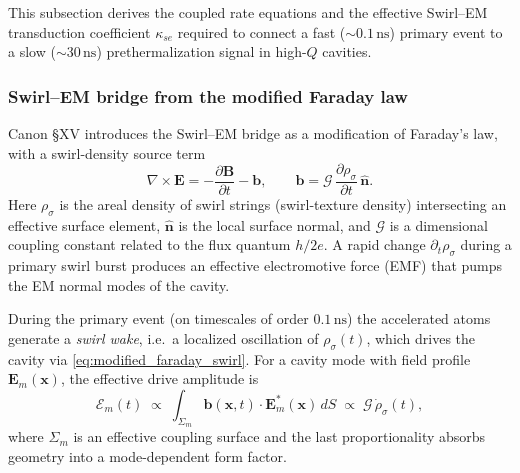 \documentclass[10pt,reprint,aps,onecolumn,nofootinbib]{revtex4-2}
\begin{document}
This subsection derives the coupled rate equations and the effective
Swirl–EM transduction coefficient \(\kappa_{se}\) required to connect a fast
(\(\sim 0.1\,\mathrm{ns}\)) primary event to a slow (\(\sim 30\,\mathrm{ns}\))
prethermalization signal in high-\(Q\) cavities.

\subsubsection{Swirl–EM bridge from the modified Faraday law}
    \label{subsec:swirl_em_bridge}

    Canon §XV introduces the Swirl–EM bridge as a modification of Faraday’s law,
    with a swirl-density source term
    \begin{equation}
        \nabla \times \mathbf{E}
        =
        -\frac{\partial \mathbf{B}}{\partial t}
        - \mathbf{b},
        \qquad
        \mathbf{b}
        =
        \mathcal{G}\,\frac{\partial \rho_{\!\sigma}}{\partial t}\,\hat{\mathbf{n}}.
        \label{eq:modified_faraday_swirl}
    \end{equation}
    Here \(\rho_{\!\sigma}\) is the areal density of swirl strings (swirl‐texture
    density) intersecting an effective surface element, \(\hat{\mathbf{n}}\) is the
    local surface normal, and \(\mathcal{G}\) is a dimensional coupling constant
    related to the flux quantum \(h/2e\). A rapid change
    \(\partial_t \rho_{\!\sigma}\) during a primary swirl burst produces an
    effective electromotive force (EMF) that pumps the EM normal modes of the
    cavity.

    During the primary event (on timescales of order \(0.1\,\mathrm{ns}\)) the
    accelerated atoms generate a \emph{swirl wake}, i.e.\ a localized oscillation
    of \(\rho_{\!\sigma}(t)\), which drives the cavity via
    \eqref{eq:modified_faraday_swirl}. For a cavity mode with field profile
    \(\mathbf{E}_m(\mathbf{x})\), the effective drive amplitude is
    \begin{equation}
        \mathcal{E}_m(t)
        \;\propto\;
        \int_{\Sigma_m} \mathbf{b}(\mathbf{x},t)\cdot \mathbf{E}_m^*(\mathbf{x})\, dS
        \;\propto\;
        \mathcal{G} \,\dot{\rho}_{\!\sigma}(t),
        \label{eq:mode_drive_from_swirl}
    \end{equation}
    where \(\Sigma_m\) is an effective coupling surface and the last proportionality
    absorbs geometry into a mode-dependent form factor.
\end{document}
